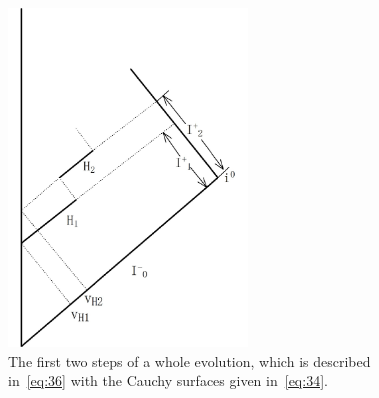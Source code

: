 \documentclass[12pt,a4paper]{article}
\begin{document}
\begin{figure}[tbp]
\setlength{\unitlength}{1mm} \centering
\includegraphics[width=2.5in]{fig1.pdf}
\caption{\label{fig:1} The first two steps of a whole evolution, which is described in~\eqref{eq:36} with the Cauchy surfaces given in~\eqref{eq:34}.}
\end{figure}
\end{document}
